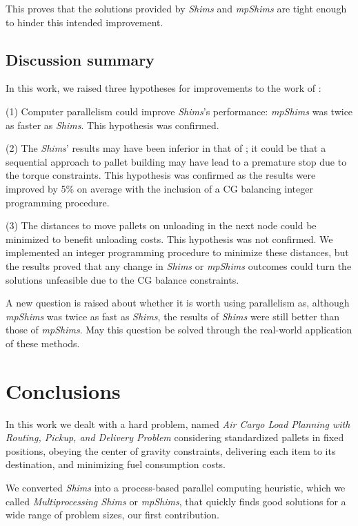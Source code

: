 \documentclass[preprint,authoryear]{elsarticle}
\begin{document}
This proves that the solutions provided by {\it Shims} and {\it mpShims} are tight enough to hinder this intended improvement.

\subsection{Discussion summary}

In this work, we raised three hypotheses for improvements to the work of \cite{MesquitaSanches2023}:

(1) Computer parallelism could improve {\it Shims}'s performance: {\it mpShims} was twice as faster as {\it Shims}. This hypothesis was confirmed.

(2) The {\it Shims}' results may have been inferior in that of \cite{MesquitaSanches2023}; it could be that a sequential approach to pallet building may have lead to a premature stop due to the torque constraints. This hypothesis was confirmed as the results were improved by 5\% on average with the inclusion of a CG balancing integer programming procedure.

(3) The distances to move pallets on unloading in the next node could be minimized to benefit unloading costs. This hypothesis was not confirmed. We implemented an integer programming procedure to minimize these distances, but the results proved that any change in {\it Shims} or {\it mpShims} outcomes could turn the solutions unfeasible due to the CG balance constraints.

A new question is raised about whether it is worth using parallelism as, although {\it mpShims} was twice as fast as {\it Shims}, the results of {\it Shims} were still better than those of {\it mpShims}. May this question be solved through the real-world application of these methods.

\section{Conclusions}
\label{sec7}

In this work we dealt with a hard problem, named {\it Air Cargo Load Planning with Routing, Pickup, and Delivery Problem} considering standardized pallets in fixed positions, obeying the center of gravity constraints, delivering each item to its destination, and minimizing fuel consumption costs.

We converted \cite{MesquitaSanches2023} {\it Shims} into a process-based parallel computing heuristic, which we called {\it Multiprocessing Shims} or {\it mpShims}, that quickly finds good solutions for a wide range of problem sizes, our first contribution.
\end{document}

